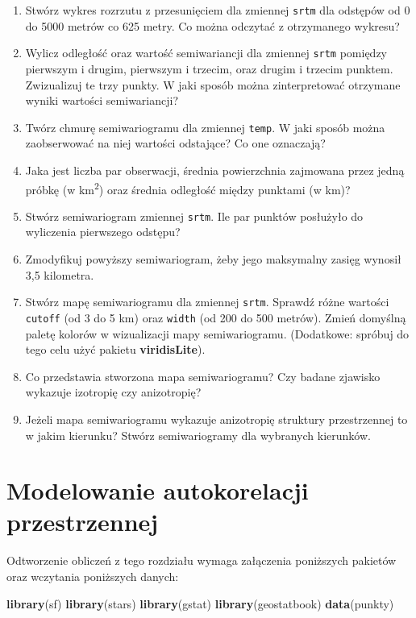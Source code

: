 \documentclass[
  paper=6in:9in,pagesize=pdftex,headinclude=on,footinclude=on,10pt]{scrbook}
\newenvironment{Shaded}{\begin{snugshade}}{\end{snugshade}}
\newcommand{\FunctionTok}[1]{\textcolor[rgb]{0.13,0.29,0.53}{\textbf{#1}}}
\newcommand{\NormalTok}[1]{#1}
\begin{document}
\begin{enumerate}
\def\labelenumi{\arabic{enumi}.}
\item
  Stwórz wykres rozrzutu z przesunięciem dla zmiennej \texttt{srtm} dla odstępów od 0 do 5000 metrów co 625 metry.
  Co można odczytać z otrzymanego wykresu?
\item
  Wylicz odległość oraz wartość semiwariancji dla zmiennej \texttt{srtm} pomiędzy pierwszym i drugim, pierwszym i trzecim, oraz drugim i trzecim punktem.
  Zwizualizuj te trzy punkty.
  W jaki sposób można zinterpretować otrzymane wyniki wartości semiwariancji?
\item
  Twórz chmurę semiwariogramu dla zmiennej \texttt{temp}.
  W jaki sposób można zaobserwować na niej wartości odstające?
  Co one oznaczają?
\item
  Jaka jest liczba par obserwacji, średnia powierzchnia zajmowana przez jedną próbkę (w km\textsuperscript{2}) oraz średnia odległość między punktami (w km)?
\item
  Stwórz semiwariogram zmiennej \texttt{srtm}.
  Ile par punktów posłużyło do wyliczenia pierwszego odstępu?
\item
  Zmodyfikuj powyższy semiwariogram, żeby jego maksymalny zasięg wynosił 3,5 kilometra.
\item
  Stwórz mapę semiwariogramu dla zmiennej \texttt{srtm}.
  Sprawdź różne wartości \texttt{cutoff} (od 3 do 5 km) oraz \texttt{width} (od 200 do 500 metrów).
  Zmień domyślną paletę kolorów w wizualizacji mapy semiwariogramu.
  (Dodatkowe: spróbuj do tego celu użyć pakietu \textbf{viridisLite}).
\item
  Co przedstawia stworzona mapa semiwariogramu?
  Czy badane zjawisko wykazuje izotropię czy anizotropię?
\item
  Jeżeli mapa semiwariogramu wykazuje anizotropię struktury przestrzennej to w jakim kierunku?
  Stwórz semiwariogramy dla wybranych kierunków.
\end{enumerate}

\chapter{Modelowanie autokorelacji przestrzennej}\label{modelowanie-matematycznie-autokorelacji-przestrzennej}

Odtworzenie obliczeń z tego rozdziału wymaga załączenia poniższych pakietów oraz wczytania poniższych danych:

\begin{Shaded}
\begin{Highlighting}[]
\FunctionTok{library}\NormalTok{(sf)}
\FunctionTok{library}\NormalTok{(stars)}
\FunctionTok{library}\NormalTok{(gstat)}
\FunctionTok{library}\NormalTok{(geostatbook)}
\FunctionTok{data}\NormalTok{(punkty)}
\end{Highlighting}
\end{Shaded}
\end{document}
